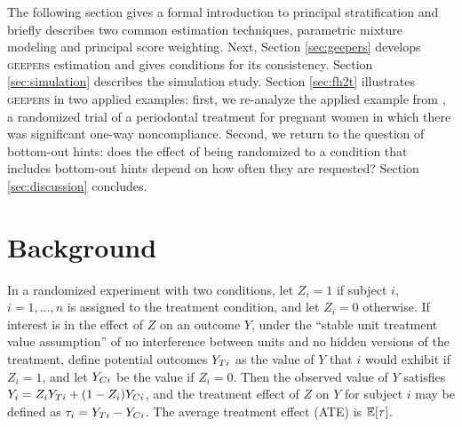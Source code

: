 \documentclass[]{article}
\begin{document}
The following section gives a formal introduction to principal stratification and briefly describes two common estimation techniques, parametric mixture modeling and principal score weighting.
Next, Section \ref{sec:geepers} develops \textsc{geepers} estimation and gives conditions for its consistency.
Section \ref{sec:simulation} describes the simulation study. %
Section \ref{sec:fh2t} illustrates \textsc{geepers} in two applied examples: first, we re-analyze the applied example from \citet{richardson2023estimating}, a randomized trial of a periodontal treatment for pregnant women in which there was significant one-way noncompliance. Second, we return to the question of bottom-out hints: does the effect of being randomized to a condition that includes bottom-out hints depend on how often they are requested?  Section \ref{sec:discussion} concludes.


\section{Background}
In a randomized experiment with two conditions, let $Z_i=1$ if subject $i$, $i=1,\dots,n$ is assigned to the treatment condition, and let $Z_i=0$ otherwise.
If interest is in the effect of $Z$ on an outcome $Y$, under the ``stable unit treatment value assumption'' \citep{air} of no interference between units and no hidden versions of the treatment, define potential outcomes \citep{splawa1990application} $Y_{Ti}$ as the value of $Y$ that $i$ would exhibit if $Z_i=1$, and let $Y_{Ci}$ be the value if $Z_i=0$. Then the observed value of $Y$ satisfies $Y_i=Z_iY_{Ti}+(1-Z_i)Y_{Ci}$, and the treatment effect of $Z$ on $Y$ for subject $i$ may be defined as $\tau_i=Y_{Ti}-Y_{Ci}$. The average treatment effect (ATE) is $\mathbb{E}[\tau]$. %
\end{document}
